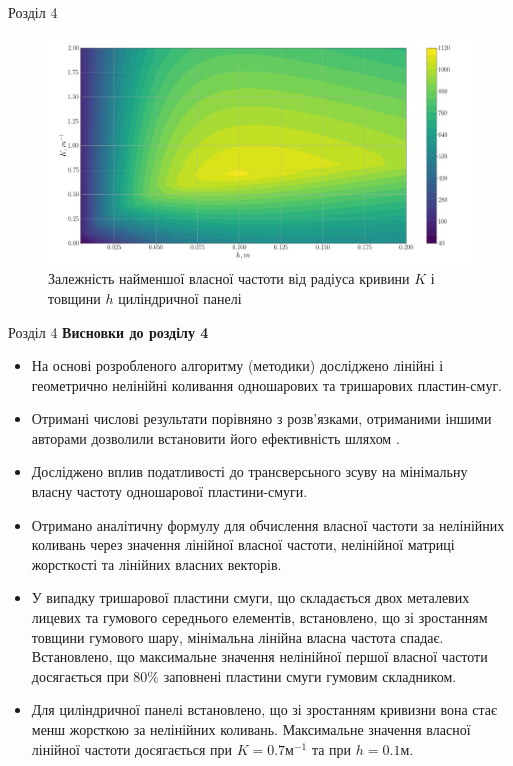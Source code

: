 \documentclass[8pt]{beamer}
\numberwithin{figure}{section}
\numberwithin{equation}{section}
\numberwithin{table}{section}
\begin{document}
\begin{frame}{Розділ 4}

\begin{figure}
	\includegraphics[scale=0.2]{pic/thickness_curvature_contour_plot2.png}
		\caption{Залежність найменшої власної частоти від радіуса кривини $K$ і товщини $h$ циліндричної панелі}
		\label{fig:omaga_K_h}
\end{figure}

\end{frame}

\begin{frame}{Розділ 4}
\textbf{Висновки до розділу 4}\\
\vspace{1em}
\begin{itemize}
\item На основі розробленого алгоритму (методики) досліджено лінійні і геометрично нелінійні коливання одношарових та тришарових пластин-смуг.
\item Отримані числові результати порівняно з розв'язками, отриманими іншими авторами дозволили встановити його ефективність шляхом .
\item Досліджено вплив податливості до трансверсьного зсуву на мінімальну власну частоту одношарової пластини-смуги.
\item Отримано аналітичну формулу для обчислення власної частоти за нелінійних коливань через значення лінійної власної частоти, нелінійної матриці жорсткості та лінійних власних векторів.
\item У випадку тришарової пластини смуги, що складається двох металевих лицевих та гумового середнього елементів, встановлено, що зі зростанням товщини гумового шару, мінімальна лінійна власна частота спадає. Встановлено, що максимальне значення нелінійної  першої власної частоти досягається при 80\% заповнені пластини смуги гумовим складником. 
\item Для циліндричної панелі встановлено, що зі зростанням кривизни вона стає менш жорсткою за нелінійних коливань. Максимальне значення власної лінійної частоти досягається при $K=0.7 м^{-1}$ та при $h=0.1 м$.
\end{itemize}

\end{frame}
\end{document}
